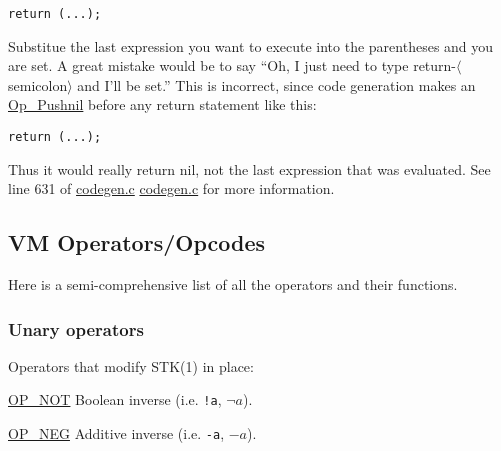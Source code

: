 \documentclass{article}
\newcommand{\todo}[1]{}
\newcommand{\nasalsourcefile}[2][]{%
  \ifthenelse{\isempty{#1}}%
    {%
      \textcolor{source}{%
        \href{https://github.com/andyross/nasal/blob/master/src/#2}{#2}%
      }%
    }%
    {%
      \textcolor{source}{%
        \href{https://github.com/andyross/nasal/blob/master/src/#2\#L#1}{#2}%
      }%
    }%
}
\newcommand{\OP} [1]{\hyperref[op:#1]{\textcolor{opcode}{OP\_#1}}}
\newcommand{\Op} [1]{\hyperref[op:#1]{\textcolor{opcode}{\sc Op\_#1}}}
\begin{document}
\begin{lstlisting}[language=Nasal]
return (...);
\end{lstlisting}

Substitue the last expression you want to execute into the parentheses and you are set.  A great mistake would be to say ``Oh, I just need to type return-$\langle$semicolon$\rangle$ and I'll be set.''  This is incorrect, since code generation makes an \Op{Pushnil} before any return statement like this:

\begin{lstlisting}[language=Nasal]
return (...);
\end{lstlisting}

Thus it would really return nil, not the last expression that was evaluated.  See line 631 of \nasalsourcefile[631]{codegen.c} for more information.

\todo{we should generalize this, turn it into a command and use it as a template for LaTex-based stack diagrams that can be emitted from Nasal directly}
\usetikzlibrary{shapes.multipart} 

\subsection{VM Operators/Opcodes}
Here is a semi-comprehensive list of all the operators and their functions.

\subsubsection{Unary operators}
Operators that modify STK(1) in place:
\begin{description}
    \item \OP{NOT} \label{op:NOT}\label{op:Not} Boolean inverse (i.e. \verb$!a$, $\neg a$).
    \item \OP{NEG} \label{op:NEG}\label{op:Neg} Additive inverse (i.e. \verb$-a$, $-a$).
\end{description}
\end{document}
